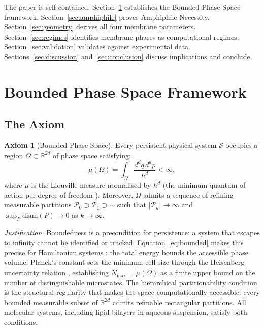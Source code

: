 \documentclass[11pt,twocolumn,a4paper]{article}
\theoremstyle{definition}
\newtheorem{axiom}{Axiom}
\theoremstyle{remark}
\begin{document}
The paper is self-contained. Section~\ref{sec:bps} establishes the Bounded Phase
Space framework. Section~\ref{sec:amphiphile} proves Amphiphile Necessity.
Section~\ref{sec:geometry} derives all four membrane parameters.
Section~\ref{sec:regimes} identifies membrane phases as computational regimes.
Section~\ref{sec:validation} validates against experimental data.
Sections~\ref{sec:discussion} and~\ref{sec:conclusion} discuss implications
and conclude.

\section{Bounded Phase Space Framework}
\label{sec:bps}

\subsection{The Axiom}

\begin{axiom}[Bounded Phase Space]
\label{ax:bps}
Every persistent physical system $\mathcal{S}$ occupies a region
$\Omega \subset \mathbb{R}^{2d}$ of phase space satisfying:
\begin{equation}
\mu(\Omega) = \int_\Omega \frac{d^d q\, d^d p}{h^d} < \infty,
\label{eq:bounded}
\end{equation}
where $\mu$ is the Liouville measure normalised by $h^d$ (the
minimum quantum of action per degree of freedom \citep{planck1901,
heisenberg1927}). Moreover, $\Omega$ admits a sequence of refining
measurable partitions $\mathscr{P}_0 \supset \mathscr{P}_1 \supset \cdots$
such that $|\mathscr{P}_k| \to \infty$ and
$\sup_P \mathrm{diam}(P) \to 0$ as $k \to \infty$.
\end{axiom}

\noindent\textit{Justification.} Boundedness is a precondition for
persistence: a system that escapes to infinity cannot be identified or
tracked. Equation~\eqref{eq:bounded} makes this precise for Hamiltonian
systems \citep{liouville1838}: the total energy bounds the accessible
phase volume. Planck's constant sets the minimum cell size through the
Heisenberg uncertainty relation \citep{heisenberg1927}, establishing
$N_{\max} = \mu(\Omega)$ as a finite upper bound on the number of
distinguishable microstates. The hierarchical partitionability condition
is the structural regularity that makes the space computationally accessible:
every bounded measurable subset of $\mathbb{R}^{2d}$ admits refinable
rectangular partitions. All molecular systems, including lipid bilayers
in aqueous suspension, satisfy both conditions.
\end{document}
